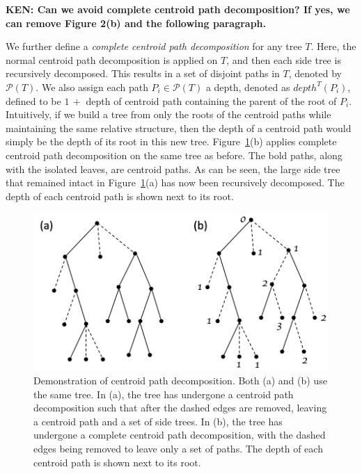\documentclass[final,1p,times]{elsarticle}
\begin{document}
    {\bf KEN: Can we avoid complete centroid path decomposition? If yes, we can remove Figure 2(b) and the following paragraph.}

    We further define a \textit{complete centroid path decomposition} for any tree $T$. Here, the normal centroid path decomposition is applied on $T$, and then each side tree is recursively decomposed. This results in a set of disjoint paths in $T$, denoted by $\mathcal{P}(T)$. We also assign each path $P_i \in \mathcal{P}(T)$ a depth, denoted as $depth^{T}(P_i)$, defined to be $1\, +$ depth of centroid path containing the parent of the root of $P_i$. Intuitively, if we build a tree from only the roots of the centroid paths while maintaining the same relative structure, then the depth of a centroid path would simply be the depth of its root in this new tree. Figure~\ref{fig:centroid}(b) applies complete centroid path decomposition on the same tree as before. The bold paths, along with the isolated leaves, are centroid paths. As can be seen, the large side tree that remained intact in Figure~\ref{fig:centroid}(a) has now been recursively decomposed. The depth of each centroid path is shown next to its root.

    \begin{figure}[ht]
        \includegraphics[scale=0.5]{centroid}
        \centering
        \caption[Centroid path decomposition]{Demonstration of centroid path decomposition. Both (a) and (b) use the same tree. In (a), the tree has undergone a centroid path decomposition such that after the dashed edges are removed, leaving a centroid path and a set of side trees. In (b), the tree has undergone a complete centroid path decomposition, with the dashed edges being removed to leave only a set of paths. The depth of each centroid path is shown next to its root.}
        \label{fig:centroid}
    \end{figure}
\end{document}
